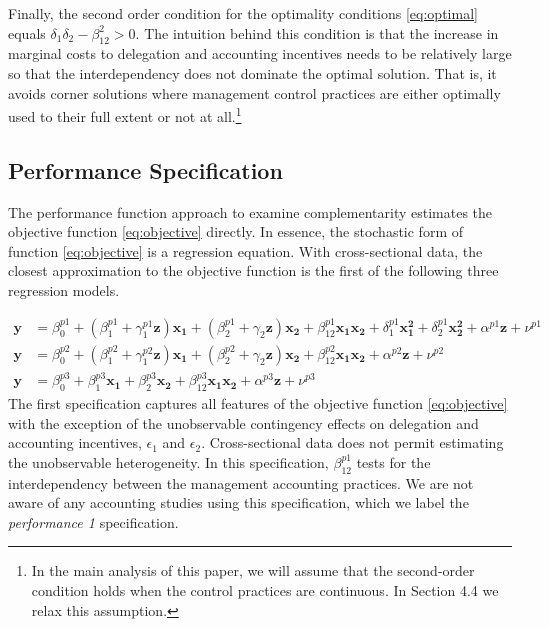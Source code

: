 \documentclass[12pt]{article}
\begin{document}
Finally, the second order condition for the optimality conditions \eqref{eq:optimal} equals $\delta_1 \delta_2 - \beta_{12}^2 > 0$. The intuition behind this condition is that the increase in marginal costs to delegation and accounting incentives needs to be relatively large so that the interdependency does not dominate the optimal solution. That is, it avoids corner solutions where management control practices are either optimally used to their full extent or not at all.\footnote{In the main analysis of this paper, we will assume that the second-order condition holds when the control practices are continuous. In Section 4.4 we relax this assumption.}

\subsection{Performance Specification}

The performance function approach to examine complementarity estimates the objective function \eqref{eq:objective} directly. In essence, the stochastic form of function \eqref{eq:objective} is a regression equation. With cross-sectional data, the closest approximation to the objective function is the first of the following three regression models.  

\begin{align*}
\mathbf{y} &=  \beta^{p1}_0 + (\beta^{p1}_{1} + \gamma_1^{p1} \mathbf{z} )\mathbf{x_1} 
						+ (\beta_{2}^{p1} + \gamma_2 \mathbf{z} ) \mathbf{x_2} 
                        + \beta_{12}^{p1} \mathbf{x_1} \mathbf{x_2} 
                        + \delta_1^{p1} \mathbf{x^2_1} + \delta_2^{p1} \mathbf{x^2_2} 
                        + \alpha^{p1} \mathbf{z}
                        + \nu^{p1} \\
 \mathbf{y} &=  \beta^{p2}_0 + (\beta^{p2}_{1} + \gamma_1^{p2} \mathbf{z} )\mathbf{x_1} 
						+ (\beta_{2}^{p2} + \gamma_2 \mathbf{z} ) \mathbf{x_2} 
                        + \beta_{12}^{p2} \mathbf{x_1} \mathbf{x_2} 
                        + \alpha^{p2} \mathbf{z}
                        + \nu^{p2} \\
 \mathbf{y} &=  \beta^{p3}_0 + \beta^{p3}_{1} \mathbf{x_1} 
						+ \beta_{2}^{p3} \mathbf{x_2} 
                        + \beta_{12}^{p3} \mathbf{x_1} \mathbf{x_2} 
                        + \alpha^{p3} \mathbf{z}
                        + \nu^{p3}
\end{align*}
The first specification captures all features of the objective function \eqref{eq:objective} with the exception of the unobservable contingency effects on delegation and accounting incentives, $\epsilon_1$ and $\epsilon_2$. Cross-sectional data does not permit estimating the unobservable heterogeneity. In this specification, \(\beta_{12}^{p1}\) tests for the interdependency between the management accounting practices. We are not aware of any accounting studies using this specification, which we label the \emph{performance 1} specification. 
\end{document}
